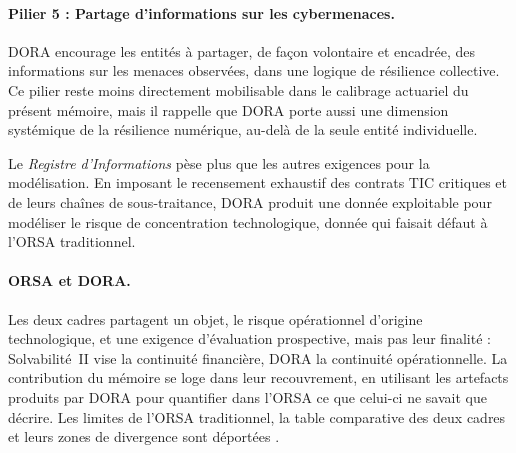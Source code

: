 \paragraph{Pilier 5 : Partage d'informations sur les cybermenaces.} DORA
encourage les entités à partager, de façon volontaire et encadrée, des
informations sur les menaces observées, dans une logique de résilience
collective. Ce pilier reste moins directement mobilisable dans le calibrage
actuariel du présent mémoire, mais il rappelle que DORA porte aussi une
dimension systémique de la résilience numérique, au-delà de la seule
entité individuelle.

Le \emph{Registre d'Informations} pèse plus que les autres exigences pour la modélisation. En
imposant le recensement exhaustif des contrats TIC critiques et de leurs chaînes de
sous-traitance, DORA produit une donnée exploitable pour modéliser le risque de concentration
technologique, donnée qui faisait défaut à l'ORSA traditionnel.



\paragraph{ORSA et DORA.} Les deux cadres partagent un objet, le risque opérationnel d'origine
technologique, et une exigence d'évaluation prospective, mais pas leur finalité : Solvabilité~II
vise la continuité financière, DORA la continuité opérationnelle. La contribution du mémoire se
loge dans leur recouvrement, en utilisant les artefacts produits par DORA pour quantifier dans
l'ORSA ce que celui-ci ne savait que décrire. Les limites de l'ORSA traditionnel, la table
comparative des deux cadres et leurs zones de divergence sont déportées \matcomp.


